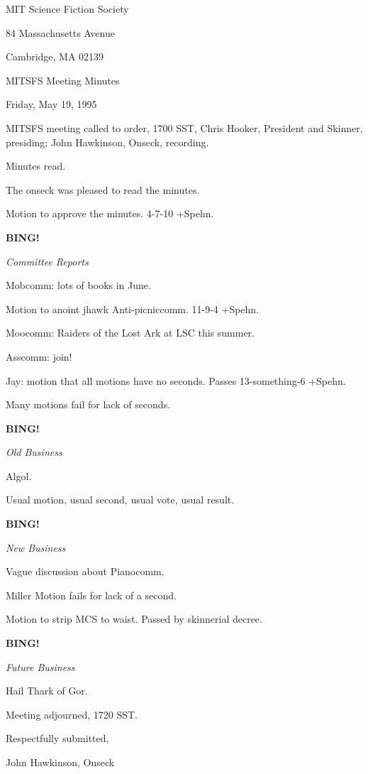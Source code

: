 \documentclass[12pt]{article}
\newcommand{\bing}{{\bf BING!} }
\newcommand{\goto}[1]{\bing \vskip 12pt \centerline{{\em{#1}}}}
\begin{document}
\begin{center}

MIT Science Fiction Society 

84 Massachusetts Avenue

Cambridge, MA 02139

\vspace{12pt}

MITSFS Meeting Minutes 

Friday, May 19, 1995

\end{center}
 
\vspace{18pt}

\setlength{\parskip}{6pt}

\noindent
MITSFS meeting called to order, 1700 SST,
Chris Hooker, President and Skinner, presiding; John Hawkinson, Onseck, recording.

Minutes read.

The onseck was pleased to read the minutes.

Motion to approve the minutes. 4-7-10 +Spehn.

\goto{Committee Reports}

Mobcomm: lots of books in June.

Motion to anoint jhawk Anti-picniccomm. 11-9-4 +Spehn.

Moocomm: Raiders of the Lost Ark at LSC this summer.

Asscomm: join!

Jay: motion that all motions have no seconds. Passes 13-something-6 +Spehn.

Many motions fail for lack of seconds.

\goto{Old Business}

Algol.

Usual motion, usual second, usual vote, usual result.

\goto{New Business}

Vague discussion about Pianocomm.

Miller Motion fails for lack of a second.

Motion to strip MCS to waist. Passed by skinnerial decree.

\goto{Future Business}

Hail Thark of Gor.

\vspace{12pt}

\noindent
Meeting adjourned, 1720 SST.

\vspace{18pt}

\centerline{Respectfully submitted,}
\centerline{John Hawkinson, Onseck}
\end{document}

